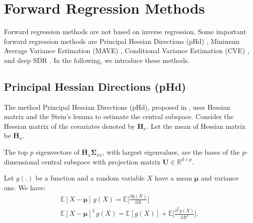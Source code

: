 \documentclass[lang=cn,10pt]{gorgeousnbook}
\numberwithin{equation}{section}%
\numberwithin{figure}{section}%
\begin{document}
\section{Forward Regression Methods}\label{section_forward_regression_methods}

Forward regression methods are not based on inverse regression. Some important forward regression methods are Principal Hessian Directions (pHd) \cite{li1992principal}, Minimum Average Variance Estimation (MAVE) \cite{xia2002adaptive}, Conditional Variance Estimation (CVE) \cite{fertl2021conditional}, and deep SDR \cite{banijamali2018deep,kapla2021fusing}. In the following, we introduce these methods. 

\subsection{Principal Hessian Directions (pHd)}

The method Principal Hessian Directions (pHd), proposed in \cite{li1992principal}, uses Hessian matrix and the Stein's lemma to estimate the central subspace. 
Consider the Hessian matrix of the covariates denoted by $\boldsymbol{H}_x$. Let the mean of Hessian matrix be $\bar{\boldsymbol{H}}_x$. 

\begin{lemma}[]
The top $p$ eigenvectors of $\bar{\boldsymbol{H}}_x \boldsymbol{\Sigma}_{xx}$, with largest eigenvalues, are the bases of the $p$-dimensional central subspace with projection matrix $\boldsymbol{U} \in \mathbb{R}^{d \times p}$.
\end{lemma}

\begin{lemma}
Let $g(.)$ be a function and a random variable $X$ have a mean $\boldsymbol{\mu}$ and variance one. We have:
\begin{align*}
& \mathbb{E}[X - \boldsymbol{\mu}]\, g(X) = \mathbb{E}\big[\frac{\partial g(X)}{\partial X}\big] \\
& \mathbb{E}[X - \boldsymbol{\mu}]^2\, g(X) = \mathbb{E}[g(X)] + \mathbb{E}\big[\frac{\partial^2 g(X)}{\partial X^2}\big].
\end{align*}
\end{lemma}
\end{document}
